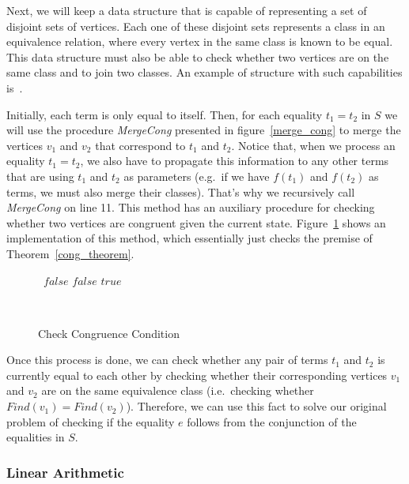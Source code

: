 Next, we will keep a data structure that is capable of representing a set of disjoint sets of vertices. Each one of these disjoint sets represents a class in an equivalence relation, where every vertex in the same class is known to be equal. This data structure must also be able to check whether two vertices are on the same class and to join two classes. An example of structure with such capabilities is~\cite{union_find}.

Initially, each term is only equal to itself. Then, for each equality $t_{1} = t_{2}$ in $S$ we will use the procedure \textit{MergeCong} presented in figure~\ref{merge_cong} to merge the vertices $v_{1}$ and $v_{2}$ that correspond to $t_{1}$ and $t_{2}$.
Notice that, when we process an equality $t_{1} = t_{2}$, we also have to propagate this information to any other terms that are using $t_{1}$ and $t_{2}$ as parameters (e.g.~if we have $f(t_{1})$ and $f(t_{2})$ as terms, we must also merge their classes). That's why we recursively call \textit{MergeCong} on line 11.
This method has an auxiliary procedure for checking whether two vertices are congruent given the current state. Figure~\ref{cong_cond} shows an implementation of this method, which essentially just checks the premise of Theorem~\ref{cong_theorem}.

\begin{figure}[t]
\begin{algorithmic}[1]
    \State\Return~$false$
  \EndIf
      \State\Return $false$
    \EndIf
  \EndFor
  \State\Return $true$
  \EndFunction
\end{algorithmic}
\caption{Check Congruence Condition}~\label{cong_cond}
\end{figure}


Once this process is done, we can check whether any pair of terms $t_{1}$ and $t_{2}$ is currently equal to each other by checking whether their corresponding vertices $v_{1}$ and $v_{2}$ are on the same equivalence class (i.e.\ checking whether $Find(v_{1}) = Find(v_{2})$). Therefore, we can use this fact to solve our original problem of checking if the equality $e$ follows from the conjunction of the equalities in $S$.

\subsubsection{Linear Arithmetic}

